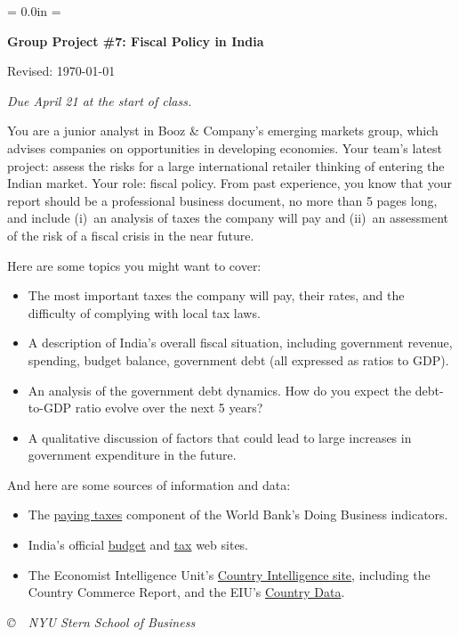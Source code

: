 \documentclass[letterpaper,12pt]{article}
\def\HeadName{Group Project \#7: Fiscal Policy in India}
\begin{document}
\parindent = 0.0in
\parskip = \bigskipamount
\thispagestyle{empty}%
\Head

\centerline{\large \bf \HeadName}%
\centerline{Revised:  \today}

\medskip
{\it Due April 21 at the start of class. }
\medskip

You are a junior analyst in Booz \& Company's emerging markets group, 
which advises companies on opportunities in developing economies.  
Your team's latest project:  assess the risks for a 
large international retailer thinking of entering the Indian market.  
Your role:  fiscal policy.  
From past experience, you know that your report should 
be a professional business document, 
no more than 5 pages long,  
and include
(i)~an analysis of taxes the company will pay and 
(ii)~an assessment of the risk of a fiscal crisis in the near future.  


Here are some topics you might want to cover:  
%
\begin{itemize}

\item The most important taxes the company will pay, their rates, 
and the difficulty of complying with local tax laws.   

\item A description of India's overall fiscal situation, 
including government revenue, spending, budget balance, 
government debt (all expressed as ratios to GDP).  

\item An analysis of the government debt dynamics.  
How do you expect the debt-to-GDP ratio evolve over the next 5 years?  

\item A qualitative discussion of factors  
that could lead to large increases in government expenditure 
in the future.  

\end{itemize}
%
And here are some sources of information and data:  
%
\begin{itemize}
\item The  
\href{http://www.doingbusiness.org/ExploreTopics/PayingTaxes/}
{paying taxes}
component of the World Bank's Doing Business indicators.  

\item India's official  
\href{http://indiabudget.nic.in/}{budget}
and 
\href{http://www.indianembassy.org/newsite//doing_business_in_india/fiscal_taxation_system_in_india.asp}
{tax} 
web sites.  

\item The Economist Intelligence Unit's
\href{http://db.eiu.com/index.asp?layout=publicationTypes}
{Country Intelligence site},  
including the Country Commerce Report, 
and the EIU's
\href{http://www.countrydata.bvdep.com/cgi/template.dll?product=101&user=ipaddress}
{Country Data}.  

\end{itemize}



\vfill \centerline{\it \copyright \ \number\year \
 NYU Stern School of Business}
\end{document}
